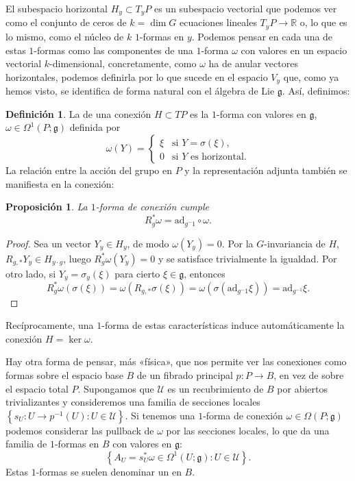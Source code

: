 \documentclass[12pt,a4paper]{article}
\newtheorem{prop}[thm]{Proposición}
\theoremstyle{definition} \newtheorem{defn}[thm]{Definición}
\theoremstyle{definition} \newtheorem{ejemplo}[thm]{Ejemplo}
\theoremstyle{definition} \newtheorem{ejercicio}[thm]{Ejercicio}
\theoremstyle{remark} \newtheorem*{obs}{Observación}
\def\gg{\mathfrak{g}}
\def\ad{\mathrm{ad}}
\def\RR{\mathbb{R}}
\let\emph\relax
\begin{document}
	El subespacio horizontal $H_y\subset T_yP$ es un subespacio vectorial que podemos ver como el conjunto de ceros de $k=\dim G$ ecuaciones lineales $T_yP \rightarrow \RR$ o, lo que es lo mismo, como el núcleo de $k$ $1$-formas en $y$. Podemos pensar en cada una de estas $1$-formas como las componentes de una $1$-forma $\omega$ con valores en un espacio vectorial $k$-dimensional, concretamente, como $\omega$ ha de anular vectores horizontales, podemos definirla por lo que sucede en el espacio $V_y$ que, como ya hemos visto, se identifica de forma natural con el álgebra de Lie $\gg$. Así, definimos:
	\begin{defn}
	  La \emph{$1$-forma de conexión} de una conexión $H\subset TP$ es la $1$-forma con valores en $\gg$, $\omega\in \Omega^1(P;\gg)$ definida por
	  \begin{equation*}
	    \omega(Y)=
	    \begin{cases}
	      \xi & \text{si } Y=\sigma(\xi), \\
	      0 & \text{si } Y \text{ es horizontal.}
	    \end{cases}
	  \end{equation*}
	  La relación entre la acción del grupo en $P$ y la representación adjunta también se manifiesta en la conexión:
	  \begin{prop}
	    La $1$-forma de conexión cumple
	    \begin{equation*}
	      R^*_g\omega=\ad_{g^-1}\circ \omega.
	    \end{equation*}
	  \end{prop}
	  \begin{proof}
	    Sea un vector $Y_y\in H_y$, de modo $\omega(Y_y)=0$. Por la $G$-invariancia de $H$, $R_{g,*}Y_y\in H_{y\cdot g}$, luego $R_g^* \omega(Y_y)=0$ y se satisface trivialmente la igualdad. Por otro lado, si $Y_y=\sigma_y(\xi)$ para cierto $\xi \in \gg$, entonces
	    \begin{equation*}
	      R_g^*\omega(\sigma(\xi))=\omega(R_{g,*}\sigma(\xi))=\omega(\sigma(\ad_{g^-1}\xi))=\ad_{g^{-1}}\xi.
	    \end{equation*}
	  \end{proof}
	\end{defn}
	Recíprocamente, una $1$-forma de estas características induce automáticamente la conexión $H=\ker \omega$.

	Hay otra forma de pensar, más «física», que nos permite ver las conexiones como formas sobre el espacio base $B$ de un fibrado principal $p:P\rightarrow B$, en vez de sobre el espacio total $P$. Supongamos que $\mathcal{U}$ es un recubrimiento de $B$ por abiertos trivializantes y consideremos una familia de secciones locales $\left\{ s_U:U\rightarrow p^{-1}(U):U\in \mathcal{U} \right\}$. Si tenemos una $1$-forma de conexión $\omega \in \Omega(P;\gg)$ podemos considerar las pullback de $\omega$ por las secciones locales, lo que da una familia de $1$-formas en $B$ con valores en $\gg$: 
	\begin{equation*}
	  \left\{ A_U=s_U^*\omega \in \Omega^1(U;\gg): U\in \mathcal{U} \right\}.
	\end{equation*}
	Estas $1$-formas se suelen denominar un \emph{campo gauge} en $B$.
\end{document}
